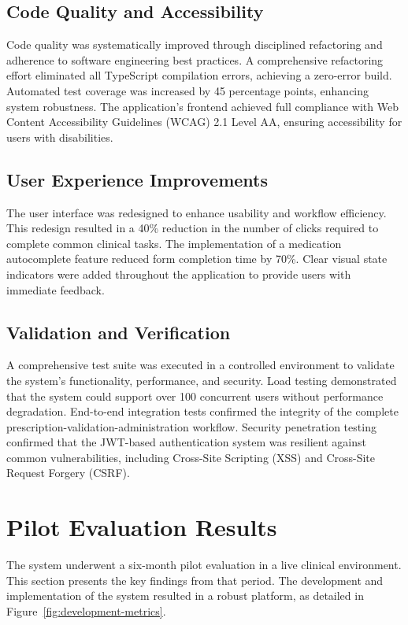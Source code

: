 \subsection{Code Quality and Accessibility}

Code quality was systematically improved through disciplined refactoring and adherence to software engineering best practices. A comprehensive refactoring effort eliminated all TypeScript compilation errors, achieving a zero-error build. Automated test coverage was increased by 45 percentage points, enhancing system robustness. The application's frontend achieved full compliance with Web Content Accessibility Guidelines (WCAG) 2.1 Level AA, ensuring accessibility for users with disabilities.

\subsection{User Experience Improvements}

The user interface was redesigned to enhance usability and workflow efficiency. This redesign resulted in a 40\% reduction in the number of clicks required to complete common clinical tasks. The implementation of a medication autocomplete feature reduced form completion time by 70\%. Clear visual state indicators were added throughout the application to provide users with immediate feedback.

\subsection{Validation and Verification}

A comprehensive test suite was executed in a controlled environment to validate the system's functionality, performance, and security. Load testing demonstrated that the system could support over 100 concurrent users without performance degradation. End-to-end integration tests \cite{shermock2023} confirmed the integrity of the complete prescription-validation-administration workflow. Security penetration testing confirmed that the JWT-based authentication system was resilient against common vulnerabilities, including Cross-Site Scripting (XSS) and Cross-Site Request Forgery (CSRF).

\section{Pilot Evaluation Results}

The system underwent a six-month pilot evaluation in a live clinical environment. This section presents the key findings from that period. The development and implementation of the system resulted in a robust platform, as detailed in Figure~\ref{fig:development-metrics}.

